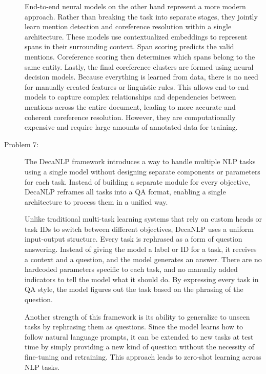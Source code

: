 \documentclass[10pt]{article}
\begin{document}
\begin{description}
End-to-end neural models on the other hand represent a more modern approach. Rather than breaking the task into separate stages, 
they jointly learn mention detection and coreference resolution within a single architecture. These models use contextualized embeddings 
to represent spans in their surrounding context. Span scoring predicts the valid mentions. Coreference scoring then determines which spans
belong to the same entity. Lastly, the final coreference clusters are formed using neural decision models. 
Because everything is learned from data, there is no need for manually created features or linguistic rules.
This allows end-to-end models to capture complex relationships and dependencies between mentions across the entire document, 
leading to more accurate and coherent coreference resolution. However, they are computationally expensive and require large amounts of annotated data for training.

\item[Problem 7:] \hfill %

The DecaNLP framework introduces a way to handle multiple NLP tasks using a single model without designing separate components or parameters for each task. 
Instead of building a separate module for every objective, DecaNLP reframes all tasks into a QA format, enabling a single architecture to process them in a unified way.

Unlike traditional multi-task learning systems that rely on custom heads or task IDs to switch between different objectives, 
DecaNLP uses a uniform input-output structure. Every task is rephrased as a form of question answering.
Instead of giving the model a label or ID for a task, it receives a context and a question, and the model generates an answer.
There are no hardcoded parameters specific to each task, and no manually added indicators to tell the model what it should do.
By expressing every task in QA style, the model figures out the task based on the phrasing of the question.

Another strength of this framework is its ability to generalize to unseen tasks by rephrasing them as questions. 
Since the model learns how to follow natural language prompts, it can be extended to new tasks at test time by simply providing
a new kind of question without the necessity of fine-tuning and retraining. This approach leads to zero-shot learning across NLP tasks.

\pagebreak


\end{description}
\end{document}
